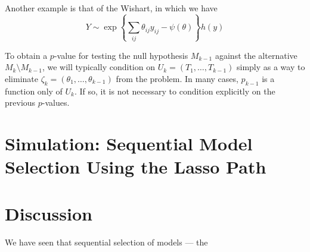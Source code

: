 \documentclass{article}
\begin{document}
Another example is that of the Wishart, in which we have
\begin{equation}
  Y \sim \exp\left\{ \sum_{ij} \theta_{ij}y_{ij} - \psi(\theta)\right\}h(y)
\end{equation}

To obtain a $p$-value for testing the null hypothesis $M_{k-1}$ against the alternative $M_k \setminus M_{k-1}$, we will typically condition on $U_k=(T_1,\ldots, T_{k-1})$ simply as a way to eliminate $\zeta_k=(\theta_1,\ldots, \theta_{k-1})$ from the problem. In many cases, $p_{k-1}$ is a function only of $U_k$. If so, it is not necessary to condition explicitly on the previous $p$-values.


\section{Simulation: Sequential Model Selection Using the Lasso Path}



\section{Discussion}

We have seen that sequential selection of models --- the 



\end{document}
